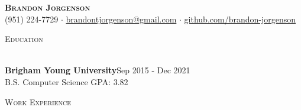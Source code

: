\documentclass[letterpaper]{article}
\newcommand{\lineunder} {
    \vspace*{-8pt} \\
    \hspace*{-18pt} \hrulefill \\
}
\newcommand{\header} [1] {
    {\hspace*{-18pt}\vspace*{6pt} \textsc{#1}}
    \vspace*{-6pt} \lineunder
    \vspace{1mm}
}
\begin{document}
\vspace*{-40pt}

\vspace*{-10pt}
\begin{center}
	{\Huge \scshape \textbf {Brandon Jorgenson}}\\
    \vspace{1mm}
	(951) 224-7729 $\cdot$ \href{mailto:brandontjorgenson@gmail.com}{brandontjorgenson@gmail.com} $\cdot$ \href{https://github.com/brandon-jorgenson}{github.com/brandon-jorgenson}\\
\end{center}

\header{Education}
\textbf{Brigham Young University}\hfill Sep 2015 - Dec 2021\\
\vspace{.5mm}
B.S. Computer Science  \hfill {GPA: 3.82}\\
\vspace{2mm}

\header{Work Experience}
\end{document}
